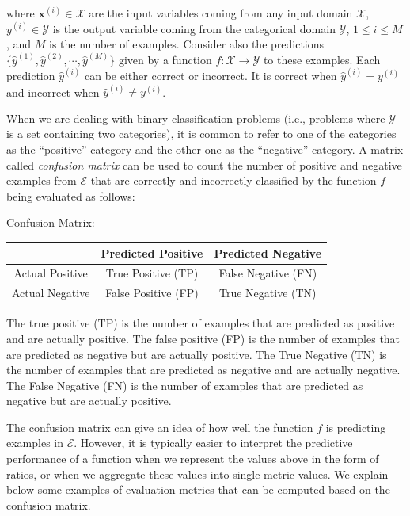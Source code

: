 \noindent where $\mathbf{x}^{(i)} \in \mathcal{X}$ are the input variables coming from any input domain $\mathcal{X}$, $y^{(i)} \in \mathcal{Y}$ is the output variable coming from the categorical domain $\mathcal{Y}$, $1 \leq i \leq M$, and $M$ is the number of examples.  Consider also the predictions $\{\hat{y}^{(1)},\hat{y}^{(2)}, \cdots, \hat{y}^{(M)}\}$ given by a function $f: \mathcal{X} \rightarrow \mathcal{Y}$ to these examples. Each prediction $\hat{y}^{(i)}$ can be either correct or incorrect. It is correct when $\hat{y}^{(i)} = y^{(i)}$ and incorrect when $\hat{y}^{(i)} \neq y^{(i)}$.

When we are dealing with binary classification problems (i.e., problems where $\mathcal{Y}$ is a set containing two categories), it is common to refer to one of the categories as the ``positive'' category and the other one as the ``negative'' category. A matrix called \textit{confusion matrix} can be used to count the number of positive and negative examples from $\mathcal{E}$ that are correctly and incorrectly classified by the function $f$ being evaluated as follows:

\begin{center}
Confusion Matrix:
\begin{tabular}{|c|c|c|}\hline
     & Predicted Positive & Predicted Negative \\ \hline
Actual Positive     &   True Positive (TP)    &   False Negative (FN)    \\ \hline
Actual Negative     &   False Positive (FP)   &   True Negative (TN)    \\ \hline
\end{tabular}
\end{center}

The true positive (TP) is the number of examples that are predicted as positive and are actually positive. The false positive (FP) is the number of examples that are predicted as negative but are actually positive. The True Negative (TN) is the number of examples that are predicted as negative and are actually negative. The False Negative (FN) is the number of examples that are predicted as negative but are actually positive.

The confusion matrix can give an idea of how well the function $f$ is predicting examples in $\mathcal{E}$. However, it is typically easier to interpret the predictive performance of a function when we represent the values above in the form of ratios, or when we aggregate these values into single metric values. We explain below some examples of evaluation metrics that can be computed based on the confusion matrix. 


